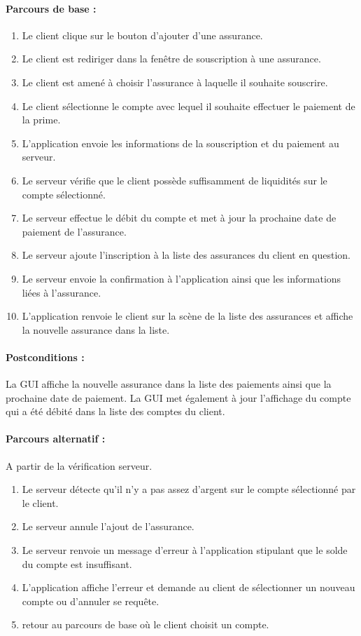 \documentclass[../annexe.tex]{subfiles}
\begin{document}
\paragraph{Parcours de base :}
		\begin{enumerate}
				\item Le client clique sur le bouton d'ajouter d'une assurance.
				\item Le client est rediriger dans la fenêtre de souscription à une assurance.
				\item Le client est amené à choisir l'assurance à laquelle il souhaite souscrire. 
				\item Le client sélectionne le compte avec lequel il souhaite effectuer le paiement de la prime.
				\item L'application envoie les informations de la souscription et du paiement au serveur.
				\item Le serveur vérifie que le client possède suffisamment de liquidités sur le compte sélectionné.
				\item Le serveur effectue le débit du compte et met à jour la prochaine date de paiement de l'assurance.
				\item Le serveur ajoute l'inscription à la liste des assurances du client en question.
				\item Le serveur envoie la confirmation à l'application ainsi que les informations liées à l'assurance.
				\item L'application renvoie le client sur la scène de la liste des assurances et affiche la nouvelle assurance dans la liste.
		\end{enumerate}
\paragraph{Postconditions :}
		La GUI affiche la nouvelle assurance dans la liste des paiements ainsi que la prochaine date de paiement. La GUI met également à jour l'affichage du compte qui a
		été débité dans la liste des comptes du client.

\paragraph{Parcours alternatif :} A partir de la vérification serveur.
\begin{enumerate}
		\item Le serveur détecte qu'il n'y a pas assez d'argent sur le compte sélectionné par le client.
		\item Le serveur annule l'ajout de l'assurance.
		\item Le serveur renvoie un message d'erreur à l'application stipulant que le solde du compte est insuffisant.
		\item L'application affiche l'erreur et demande au client de sélectionner un nouveau compte ou d'annuler se requête.
		\item retour au parcours de base où le client choisit un compte.
\end{enumerate}
\newpage
\end{document}
